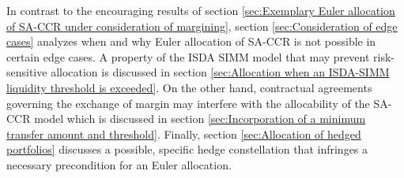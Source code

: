\documentclass[../Thesis_AHoecherl.tex]{subfiles}
\begin{document}
    In contrast to the encouraging results of section \ref{sec:Exemplary Euler allocation of SA-CCR under consideration of margining}, section \ref{sec:Consideration of edge cases} analyzes when and why Euler allocation of \gls{SA-CCR} is not possible in certain edge cases.
    A property of the \gls{ISDA SIMM} model that may prevent risk-sensitive allocation is discussed in section \ref{sec:Allocation when an ISDA-SIMM liquidity threshold is exceeded}. 
    On the other hand, contractual agreements governing the exchange of margin may interfere with the allocability of the SA-CCR model which is discussed in section \ref{sec:Incorporation of a minimum transfer amount and threshold}.
    Finally, section \ref{sec:Allocation of hedged portfolios} discusses a possible, specific hedge constellation that infringes a necessary precondition for an Euler allocation.



\end{document}
